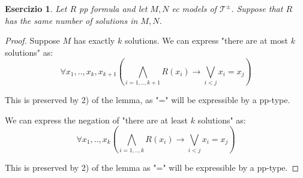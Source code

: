 \documentclass{article}
\newtheorem{exercise}{Esercizio}
\begin{document}
\begin{exercise}

	Let $R$ pp formula and let $M,N$ ec models of $\mathcal{T}^{\pm}$. Suppose that $R$ has the same number of solutions in $M,N$.

\end{exercise}

\begin{proof}

	Suppose $M$ has exactly $k$ solutions. 
	We can express "there are at most $k$ solutions" as:
	\[
		\forall x_1,..,x_k,x_{k+1} (\bigwedge_{i = 1,..,k+1} R(x_i)  \to \bigvee_{i < j} x_i = x_j)
	\]

	This is preserved by 2) of the lemma, as "=" will be expressible by a pp-type.

	We can express the negation of "there are at least $k$ solutions" as:
	\[
		\forall x_1,..,x_k  (\bigwedge_{i=1,..,k} R(x_i) \to \bigvee_{i < j} x_i = x_j)
	\]

	This is preserved by 2) of the lemma as "=" will be expressible by a pp-type.

\end{proof}
\end{document}
